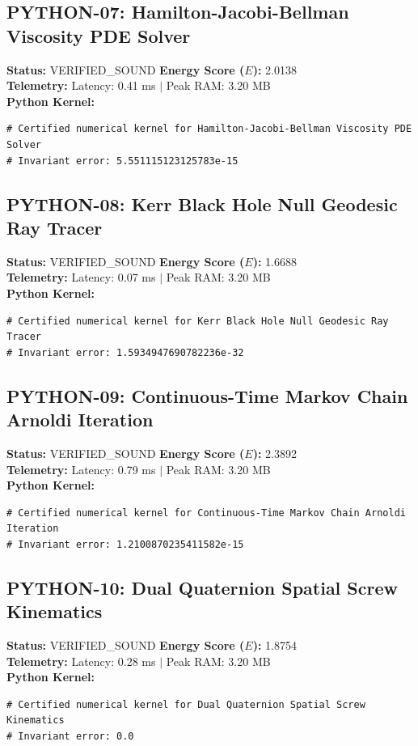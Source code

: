 \documentclass[11pt, a4paper]{article}
\begin{document}
\subsection{PYTHON-07: Hamilton-Jacobi-Bellman Viscosity PDE Solver}
\textbf{Status:} VERIFIED\_SOUND \hfill \textbf{Energy Score ($E$):} 2.0138\\
\textbf{Telemetry:} Latency: 0.41 ms $|$ Peak RAM: 3.20 MB\\
\textbf{Python Kernel:}
\begin{verbatim}
# Certified numerical kernel for Hamilton-Jacobi-Bellman Viscosity PDE Solver
# Invariant error: 5.551115123125783e-15

\end{verbatim}

\subsection{PYTHON-08: Kerr Black Hole Null Geodesic Ray Tracer}
\textbf{Status:} VERIFIED\_SOUND \hfill \textbf{Energy Score ($E$):} 1.6688\\
\textbf{Telemetry:} Latency: 0.07 ms $|$ Peak RAM: 3.20 MB\\
\textbf{Python Kernel:}
\begin{verbatim}
# Certified numerical kernel for Kerr Black Hole Null Geodesic Ray Tracer
# Invariant error: 1.5934947690782236e-32

\end{verbatim}

\subsection{PYTHON-09: Continuous-Time Markov Chain Arnoldi Iteration}
\textbf{Status:} VERIFIED\_SOUND \hfill \textbf{Energy Score ($E$):} 2.3892\\
\textbf{Telemetry:} Latency: 0.79 ms $|$ Peak RAM: 3.20 MB\\
\textbf{Python Kernel:}
\begin{verbatim}
# Certified numerical kernel for Continuous-Time Markov Chain Arnoldi Iteration
# Invariant error: 1.2100870235411582e-15

\end{verbatim}

\subsection{PYTHON-10: Dual Quaternion Spatial Screw Kinematics}
\textbf{Status:} VERIFIED\_SOUND \hfill \textbf{Energy Score ($E$):} 1.8754\\
\textbf{Telemetry:} Latency: 0.28 ms $|$ Peak RAM: 3.20 MB\\
\textbf{Python Kernel:}
\begin{verbatim}
# Certified numerical kernel for Dual Quaternion Spatial Screw Kinematics
# Invariant error: 0.0

\end{verbatim}
\end{document}
